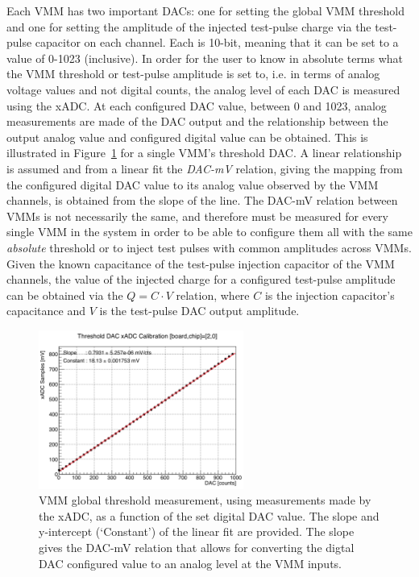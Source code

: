 Each VMM has two important DACs: one for setting the global VMM threshold and one for
setting the amplitude of the injected test-pulse charge via the test-pulse capacitor on each
channel.
Each is 10-bit, meaning that it can be set to a value of 0-1023 (inclusive).
In order for the user to know in absolute terms what the VMM threshold or test-pulse amplitude
is set to, i.e. in terms of analog voltage values and not digital counts, the analog level of each
DAC is measured using the xADC.
At each configured DAC value, between 0 and 1023, analog measurements are made of the DAC output and
the relationship between the output analog value and configured digital value can be obtained.
This is illustrated in Figure~\ref{fig:threshold_dac_calib} for a single VMM's threshold DAC.
A linear relationship is assumed and from a linear fit the \textit{DAC-mV} relation, giving
the mapping from the configured digital DAC value to its analog value observed by the VMM channels, is obtained
from the slope of the line.
The DAC-mV relation between VMMs is not necessarily the same, and therefore must be measured
for every single VMM in the system in order to be able to configure them all with the
same \textit{absolute} threshold or to inject test pulses with common amplitudes across VMMs.
Given the known capacitance of the test-pulse injection capacitor of the VMM channels,
the value of the injected charge for a configured test-pulse amplitude can be obtained via the $Q = C \cdot V$
relation, where $C$ is the injection capacitor's capacitance and $V$ is the test-pulse DAC output amplitude.%

\begin{figure}[!htb]
    \begin{center}
        \includegraphics[width=0.6\textwidth]{figures/nsw/calibration/threshold_dac_calib}
        \caption{
            VMM global threshold measurement, using measurements made by the xADC, as a function
            of the set digital DAC value.
            The slope and y-intercept (`Constant') of the linear fit are provided.
            The slope gives the DAC-mV relation that allows for converting the digtal DAC
            configured value to an analog level at the VMM inputs.
        }
        \label{fig:threshold_dac_calib}
    \end{center}
\end{figure}


